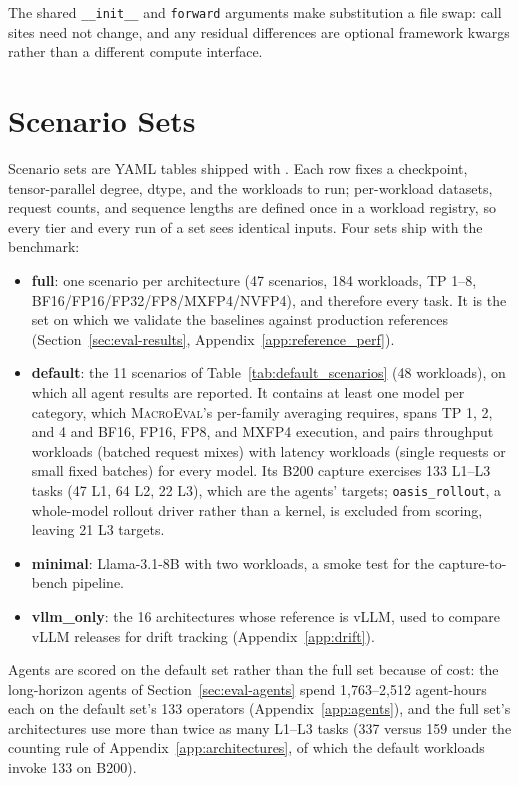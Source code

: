   \medskip

  The shared \texttt{\_\_init\_\_} and \texttt{forward} arguments make substitution a file swap: call sites need not change, and any residual differences are optional framework kwargs rather than a different compute interface.

\section{Scenario Sets}
\label{app:scenarios}

Scenario sets are YAML tables shipped with \fastkernels{}.
Each row fixes a checkpoint, tensor-parallel degree, dtype, and the workloads to run; per-workload datasets, request counts, and sequence lengths are defined once in a workload registry, so every tier and every run of a set sees identical inputs.
Four sets ship with the benchmark:
\begin{itemize}[leftmargin=*, itemsep=1pt, topsep=2pt]
\item \textbf{full}: one scenario per architecture (47 scenarios, 184 workloads, TP 1--8, BF16/FP16/FP32/FP8/MXFP4/NVFP4), and therefore every task. It is the set on which we validate the baselines against production references (Section~\ref{sec:eval-results}, Appendix~\ref{app:reference_perf}).
\item \textbf{default}: the 11 scenarios of Table~\ref{tab:default_scenarios} (48 workloads), on which all agent results are reported. It contains at least one model per category, which \textsc{MacroEval}'s per-family averaging requires, spans TP 1, 2, and 4 and BF16, FP16, FP8, and MXFP4 execution, and pairs throughput workloads (batched request mixes) with latency workloads (single requests or small fixed batches) for every model. Its B200 capture exercises 133 L1--L3 tasks (47 L1, 64 L2, 22 L3), which are the agents' targets; \texttt{oasis\_rollout}, a whole-model rollout driver rather than a kernel, is excluded from scoring, leaving 21 L3 targets.
\item \textbf{minimal}: Llama-3.1-8B with two workloads, a smoke test for the capture-to-bench pipeline.
\item \textbf{vllm\_only}: the 16 architectures whose reference is vLLM, used to compare vLLM releases for drift tracking (Appendix~\ref{app:drift}).
\end{itemize}
Agents are scored on the default set rather than the full set because of cost: the long-horizon agents of Section~\ref{sec:eval-agents} spend 1{,}763--2{,}512 agent-hours each on the default set's 133 operators (Appendix~\ref{app:agents}), and the full set's architectures use more than twice as many L1--L3 tasks (337 versus 159 under the counting rule of Appendix~\ref{app:architectures}, of which the default workloads invoke 133 on B200).

